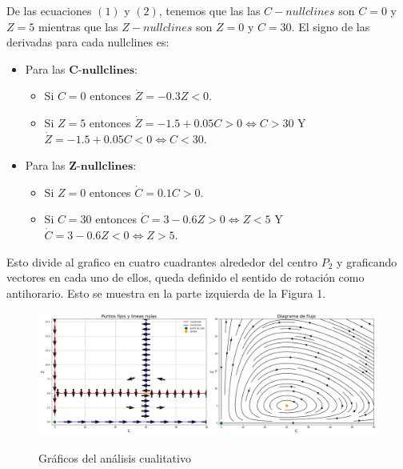 \documentclass[12pt,letterpaper]{article}
\begin{document}
De las ecuaciones $(1)$ y $(2)$, tenemos que las las $C-nullclines$ son $C = 0$ y $Z = 5$ mientras que las $Z-nullclines$ son $Z = 0$ y $C = 30$. El signo de las derivadas para cada nullclines es:

\begin{itemize}
\item Para las $\textbf{C-nullclines}$:
\begin{itemize}

\item Si $C = 0$ entonces $\dot{Z} = -0.3Z < 0$.
\item Si $Z = 5$ entonces $\dot{Z} = -1.5  + 0.05C > 0 \iff C > 30$ Y $\dot{Z} = -1.5  + 0.05C < 0 \iff C < 30$.
\end{itemize}
\item Para las $\textbf{Z-nullclines}$:
\begin{itemize}
\item Si $Z = 0$ entonces $\dot{C} = 0.1C > 0$.
\item Si $C = 30$ entonces $\dot{C} = 3 - 0.6Z > 0 \iff Z < 5$ Y $\dot{C} = 3  - 0.6Z < 0 \iff Z > 5$.
\end{itemize}

\end{itemize}

Esto divide al grafico en cuatro cuadrantes alrededor del centro $P_2$ y graficando vectores en cada uno de ellos, queda definido el sentido de rotación como antihorario. Esto se muestra en la parte izquierda de la Figura 1.

\begin{figure}[h!]
\begin{floatrow}
\centering
\caption{Gráficos del análisis cualitativo}
\includegraphics[width=20cm]{./images/rabbits_and_foxes_2.png}
\label{fig:esquema}
\end{floatrow}
\end{figure}
\end{document}

